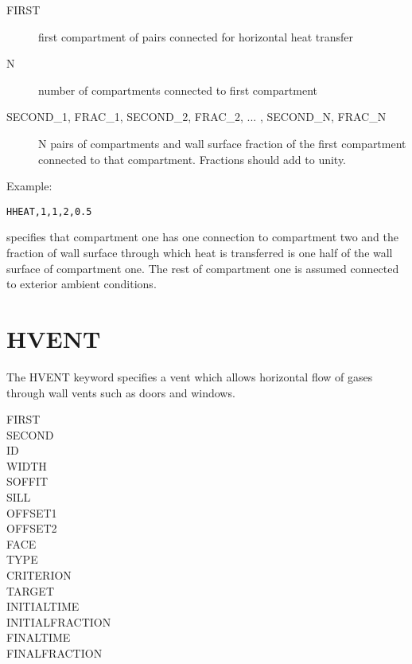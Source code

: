 \begin{adjustwidth}{1cm}{0cm}
\begin{description}
  \item[FIRST] first compartment of pairs connected for horizontal heat transfer
  \item[N] number of compartments connected to first compartment
  \item[SECOND\_1, FRAC\_1, SECOND\_2, FRAC\_2, ... ,  SECOND\_N, FRAC\_N] N pairs of compartments and wall surface fraction of the first compartment connected to that compartment. Fractions should add to unity.
\end{description}
\end{adjustwidth}

\noindent Example:

\begin{lstlisting}
HHEAT,1,1,2,0.5
\end{lstlisting}
specifies that compartment one has one connection to compartment two and the fraction of wall surface through which heat is transferred is one half of the wall surface of compartment one. The rest of compartment one is assumed connected to exterior ambient conditions.

\section{HVENT}

The HVENT keyword specifies a vent which allows horizontal flow of gases through wall vents such as doors and windows.

\begin{adjustwidth}{1cm}{0cm}
\begin{description}
  \item[FIRST]
  \item[SECOND]
  \item[ID]
  \item[WIDTH]
  \item[SOFFIT]
  \item[SILL]
  \item[OFFSET1]
  \item[OFFSET2]
  \item[FACE]
  \item[TYPE]
  \item[CRITERION]
  \item[TARGET]
  \item[INITIALTIME]
  \item[INITIALFRACTION]
  \item[FINALTIME]
  \item[FINALFRACTION]
\end{description}
\end{adjustwidth}

